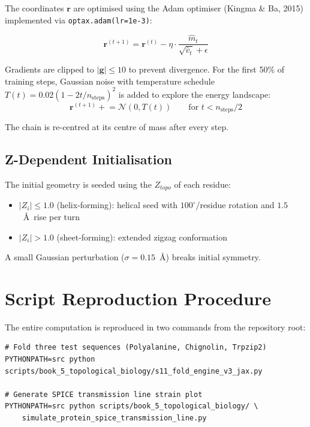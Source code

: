 The coordinates $\mathbf{r}$ are optimised using the Adam optimiser (Kingma \& Ba, 2015) implemented via \texttt{optax.adam(lr=1e-3)}:

\begin{equation}
    \mathbf{r}^{(t+1)} = \mathbf{r}^{(t)} - \eta \cdot \frac{\hat{m}_t}{\sqrt{\hat{v}_t} + \epsilon}
    \label{eq:adam}
\end{equation}

Gradients are clipped to $|\mathbf{g}| \leq 10$ to prevent divergence.  For the first 50\% of training steps, Gaussian noise with temperature schedule $T(t) = 0.02(1 - 2t/n_\text{steps})^2$ is added to explore the energy landscape:
\begin{equation}
    \mathbf{r}^{(t+1)} \mathrel{+}= \mathcal{N}(0, T(t)) \qquad \text{for } t < n_\text{steps}/2
    \label{eq:annealing}
\end{equation}

The chain is re-centred at its centre of mass after every step.

\subsection{Z-Dependent Initialisation}

The initial geometry is seeded using the $Z_{topo}$ of each residue:
\begin{itemize}
    \item $|Z_i| \leq 1.0$ (helix-forming): helical seed with $100^\circ$/residue rotation and $1.5$~\AA\ rise per turn
    \item $|Z_i| > 1.0$ (sheet-forming): extended zigzag conformation
\end{itemize}
A small Gaussian perturbation ($\sigma = 0.15$~\AA) breaks initial symmetry.

\section{Script Reproduction Procedure}

The entire computation is reproduced in two commands from the repository root:

\begin{verbatim}
# Fold three test sequences (Polyalanine, Chignolin, Trpzip2)
PYTHONPATH=src python scripts/book_5_topological_biology/s11_fold_engine_v3_jax.py

# Generate SPICE transmission line strain plot
PYTHONPATH=src python scripts/book_5_topological_biology/ \
    simulate_protein_spice_transmission_line.py
\end{verbatim}

